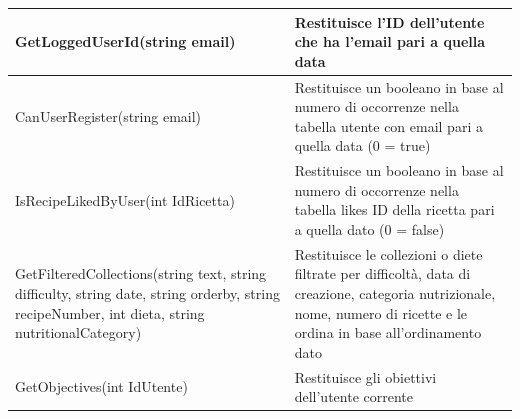 ﻿\documentclass[a4paper,12pt]{report}
\begin{document}
\begin{table}[h!]
\begin{tabular}{ |p{3in}|p{2in}| }
        \hline
        \scriptsize{GetLoggedUserId(string email)} & \scriptsize{Restituisce l'ID dell'utente che ha l'email pari a quella data} \\
        \hline
        \scriptsize{CanUserRegister(string email)} & \scriptsize{Restituisce un booleano in base al numero di occorrenze nella tabella utente con email pari a quella data (0 = true)} \\
        \hline
        \scriptsize{IsRecipeLikedByUser(int IdRicetta)} & \scriptsize{Restituisce un booleano in base al numero di occorrenze nella tabella likes ID della ricetta pari a quella dato (0 = false)} \\
        \hline
        \scriptsize{GetFilteredCollections(string text, string difficulty, string date, string orderby, string recipeNumber, int dieta, string nutritionalCategory)} & \scriptsize{Restituisce le collezioni o diete filtrate per difficoltà, data di creazione, categoria nutrizionale, nome, numero di ricette e le ordina in base all'ordinamento dato} \\
        \hline
        \scriptsize{GetObjectives(int IdUtente)} & \scriptsize{Restituisce gli obiettivi dell'utente corrente} \\
        \hline
    \end{tabular}
\end{table}
\end{document}

